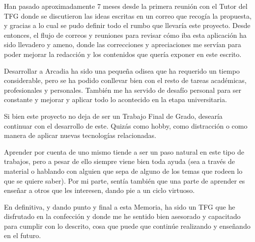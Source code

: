 Han pasado aproximadamente 7 meses desde la primera reunión con el Tutor del TFG donde se discutieron las ideas escritas en un correo que recogía la propuesta, y gracias a lo cual se pudo definir todo el rumbo que llevaría este proyecto. Desde entonces, el flujo de correos y reuniones para revisar cómo iba esta aplicación ha sido llevadero y ameno, donde las correcciones y apreciaciones me servían para poder mejorar la redacción y los contenidos que quería exponer en este escrito. 

Desarrollar a Arcadia ha sido una pequeña odisea que ha requerido un tiempo considerable, pero se ha podido conllevar bien con el resto de tareas académicas, profesionales y personales. También me ha servido de desafío personal para ser constante y mejorar y aplicar todo lo acontecido en la etapa universitaria.

Si bien este proyecto no deja de ser un Trabajo Final de Grado, desearía continuar con el desarrollo de este. Quizás como hobby, como distracción o como manera de aplicar nuevas tecnologías relacionadas. 

Aprender por cuenta de uno mismo tiende a ser un paso natural en este tipo de trabajos, pero a pesar de ello siempre viene bien toda ayuda (sea a través de material o hablando con alguien que sepa de alguno de los temas que rodeen lo que se quiere saber). Por mi parte, sentía también que una parte de aprender es enseñar a otros que les interesen, dando pie a un ciclo virtuoso.

En definitiva, y dando punto y final a esta Memoria, ha sido un TFG que he disfrutado en la confección y donde me he sentido bien asesorado y capacitado para cumplir con lo descrito, cosa que puede que continúe realizando y enseñando en el futuro.
